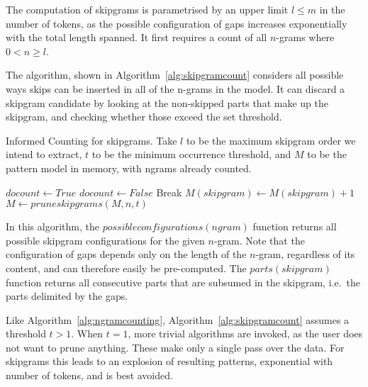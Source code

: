 \documentclass[a4paper,12pt]{article}
\begin{document}
The computation of skipgrams is parametrised by an upper limit $l\leq m$ in the number of
tokens, as the possible configuration of gaps increases exponentially with the
total length spanned. It first requires a count of all $n$-grams where $0<n\geq l$. 

The algorithm, shown in Algorithm~\ref{alg:skipgramcount} considers all
possible ways skips can be inserted in all of the n-grams in the model. It can
discard a skipgram candidate by looking at the non-skipped parts that make up the
skipgram, and checking whether those exceed the set threshold. 

\begin{algorithm} \caption{Informed Counting for skipgrams.  Take $l$
to be the maximum skipgram order we intend to extract, $t$ to be the minimum occurrence threshold, and $M$ to be the
pattern model in memory, with ngrams already counted.}
\label{alg:skipgramcount}
\begin{algorithmic}
            \State $docount \leftarrow True$
                    \State $docount \leftarrow False$
                    Break
                \EndIf
            \EndFor 
                \State $M(skipgram) \leftarrow M(skipgram) + 1$
            \EndIf
            \EndFor 
            \EndFor
    \State $M \leftarrow pruneskipgrams(M,n,t)$
\EndFor \\
\end{algorithmic}
\end{algorithm}

In this algorithm, the $possibleconfigurations(ngram)$ function returns
all possible skipgram configurations for the given $n$-gram. Note that
the configuration of gaps depends only on the length of the $n$-gram, regardless
of its content, and can therefore easily be pre-computed. The
$parts(skipgram)$ function returns all consecutive parts that are
subsumed in the skipgram, i.e.\ the parts delimited by the gaps.

Like Algorithm~\ref{alg:ngramcounting}, Algorithm~\ref{alg:skipgramcount}
assumes a threshold $t>1$. When $t=1$, more trivial algorithms are
invoked, as the user does not want to prune anything. These make only a single
pass over the data. For skipgrams this leads to an explosion of
resulting patterns, exponential with number of tokens, and is best avoided.
\end{document}
